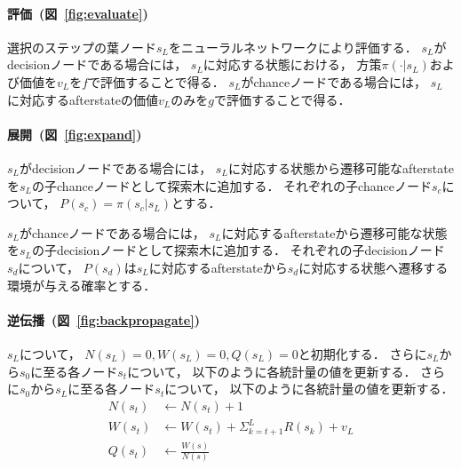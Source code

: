 \paragraph{評価~(図~\ref{fig:evaluate})}
選択のステップの葉ノード$s_L$をニューラルネットワークにより評価する．
$s_L$がdecisionノードである場合には， $s_L$に対応する状態における， 方策$\pi(\cdot|s_L)$および価値を$v_L$を$f$で評価することで得る．
$s_L$がchanceノードである場合には， $s_L$に対応するafterstateの価値$v_L$のみを$g$で評価することで得る．

\paragraph{展開~(図~\ref{fig:expand})}
$s_L$がdecisionノードである場合には， $s_L$に対応する状態から遷移可能なafterstateを$s_L$の子chanceノードとして探索木に追加する．
それぞれの子chanceノード$s_c$について， $P(s_c) = \pi(s_c|s_L)$とする．

$s_L$がchanceノードである場合には， $s_L$に対応するafterstateから遷移可能な状態を$s_L$の子decisionノードとして探索木に追加する．
それぞれの子decisionノード$s_d$について， $P(s_d)$は$s_L$に対応するafterstateから$s_d$に対応する状態へ遷移する環境が与える確率とする．

\paragraph{逆伝播~(図~\ref{fig:backpropagate})}
$s_L$について， $N(s_L)=0, W(s_L)=0, Q(s_L)=0$と初期化する．
さらに$s_L$から$s_0$に至る各ノード$s_t$について， 以下のように各統計量の値を更新する．
さらに$s_0$から$s_L$に至る各ノード$s_t$について， 以下のように各統計量の値を更新する．
\begin{align*}
  N(s_t) &\leftarrow N(s_t) + 1 \\
  W(s_t) &\leftarrow W(s_t) + \Sigma_{k=t+1}^{L} R(s_k) + v_L \\
  Q(s_t) &\leftarrow \frac{W(s)}{N(s)}
\end{align*}

